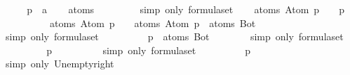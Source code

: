 \begin{isabellebody}
\isamarkupfalse%
\ \isanewline
{}\isanewline
%
\isadelimproof
\ \ %
\endisadelimproof
%
\isatagproof
{}\isamarkupfalse%
\ p\ {\isacharcolon}{\isacharcolon}\ {\isacharprime}a\isanewline
\isanewline
\ \ \isamarkupfalse%
\ {\isachardoublequoteopen}atoms\ {\isasymbottom}\ {\isacharequal}\ {\isasymemptyset}{\isachardoublequoteclose}\isanewline
\ \ \ \ \isamarkupfalse%
\ {\isacharparenleft}simp\ only{\isacharcolon}\ formula{\isachardot}set{\isacharparenright}\isanewline
\isanewline
\ \ \isamarkupfalse%
\ {\isachardoublequoteopen}atoms\ {\isacharparenleft}Atom\ p\ \isactrlbold {\isasymor}\ {\isasymbottom}{\isacharparenright}\ {\isacharequal}\ {\isacharbraceleft}p{\isacharbraceright}{\isachardoublequoteclose}\isanewline
\ \ \isamarkupfalse%
\ {\isacharminus}\isanewline
\ \ \ \ \isamarkupfalse%
\ {\isachardoublequoteopen}atoms\ {\isacharparenleft}Atom\ p\ \isactrlbold {\isasymor}\ {\isasymbottom}{\isacharparenright}\ {\isacharequal}\ atoms\ {\isacharparenleft}Atom\ p{\isacharparenright}\ {\isasymunion}\ atoms\ Bot{\isachardoublequoteclose}\isanewline
\ \ \ \ \ \ \isamarkupfalse%
\ {\isacharparenleft}simp\ only{\isacharcolon}\ formula{\isachardot}set{\isacharparenleft}{}{\isacharparenright}{\isacharparenright}\isanewline
\ \ \ \ \isamarkupfalse%
\ \isamarkupfalse%
\ {\isachardoublequoteopen}{\isasymdots}\ {\isacharequal}\ {\isacharbraceleft}p{\isacharbraceright}\ {\isasymunion}\ atoms\ Bot{\isachardoublequoteclose}\isanewline
\ \ \ \ \ \ \isamarkupfalse%
\ {\isacharparenleft}simp\ only{\isacharcolon}\ formula{\isachardot}set{\isacharparenleft}{}{\isacharparenright}{\isacharparenright}\isanewline
\ \ \ \ \isamarkupfalse%
\ \isamarkupfalse%
\ {\isachardoublequoteopen}{\isasymdots}\ {\isacharequal}\ {\isacharbraceleft}p{\isacharbraceright}\ {\isasymunion}\ {\isasymemptyset}{\isachardoublequoteclose}\isanewline
\ \ \ \ \ \ \isamarkupfalse%
\ {\isacharparenleft}simp\ only{\isacharcolon}\ formula{\isachardot}set{\isacharparenleft}{}{\isacharparenright}{\isacharparenright}\isanewline
\ \ \ \ \isamarkupfalse%
\ \isamarkupfalse%
\ {\isachardoublequoteopen}{\isasymdots}\ {\isacharequal}\ {\isacharbraceleft}p{\isacharbraceright}{\isachardoublequoteclose}\isanewline
\ \ \ \ \ \ \isamarkupfalse%
\ {\isacharparenleft}simp\ only{\isacharcolon}\ Un{\isacharunderscore}empty{\isacharunderscore}right{\isacharparenright}\isanewline

\end{isabellebody}
